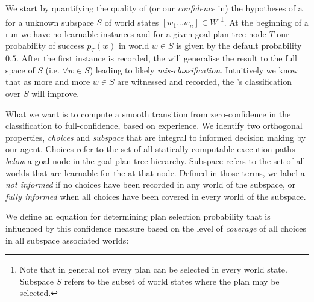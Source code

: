 We start by quantifying the quality of (or our \textit{confidence} in)
the hypotheses of a \dt for a unknown subspace $S$ of world states
$[w_1 \ldots w_n] \in W$ \footnote{Note that in general not every plan
  can be selected in every world state. Subspace $S$ refers to the
  subset of world states where the plan may be selected.}. At the
beginning of a run we have no learnable instances and for a given
goal-plan tree node $T$ our probability of success $p_T(w)$ in world
$w \in S$ is given by the default probability $0.5$. After the first
instance is recorded, the \dt will generalise the result to the full
space of $S$ (i.e. $\forall w \in S$) leading to likely
\textit{mis-classification}. Intuitively we know that as more and more
$w \in S$ are witnessed and recorded, the \dt's classification over
$S$ will improve. 


What we want is to compute a smooth transition
from zero-confidence in the \dt classification to full-confidence,
based on experience. We identify two orthogonal properties,
\textit{choices} and \textit{subspace} that are integral to informed
decision making by 
our agent. Choices refer to
the set of all statically computable execution paths \textit{below} a
goal node in the goal-plan tree hierarchy. Subspace refers to the set
of all worlds that are learnable for the \dt at that node. Defined in
those terms, we label a \dt \textit{not informed} if no choices have
been recorded in any world of the subspace, or \textit{fully informed}
when all choices have been covered in every world of the subspace. 


We define an equation for determining plan selection probability that
is influenced by this confidence measure based on the level of
\textit{coverage} of all choices in all subspace associated worlds:

